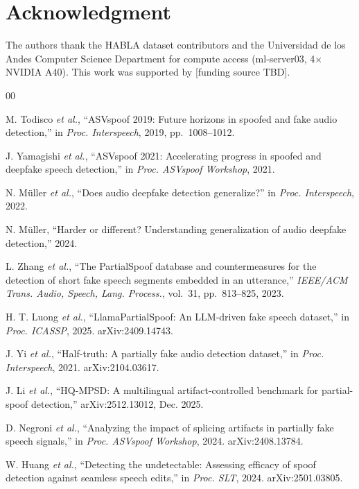 \documentclass[conference]{IEEEtran}
\begin{document}
\section*{Acknowledgment}

The authors thank the HABLA dataset contributors and the Universidad de los Andes Computer Science Department for compute access (ml-server03, 4$\times$NVIDIA A40). This work was supported by [funding source TBD].

\begin{thebibliography}{00}

 M. Todisco \emph{et al.}, ``ASVspoof 2019: Future horizons in spoofed and fake audio detection,'' in \emph{Proc. Interspeech}, 2019, pp.~1008--1012.

 J. Yamagishi \emph{et al.}, ``ASVspoof 2021: Accelerating progress in spoofed and deepfake speech detection,'' in \emph{Proc. ASVspoof Workshop}, 2021.

 N. M\"uller \emph{et al.}, ``Does audio deepfake detection generalize?'' in \emph{Proc. Interspeech}, 2022.

 N. M\"uller, ``Harder or different? Understanding generalization of audio deepfake detection,'' 2024.

 L. Zhang \emph{et al.}, ``The PartialSpoof database and countermeasures for the detection of short fake speech segments embedded in an utterance,'' \emph{IEEE/ACM Trans. Audio, Speech, Lang. Process.}, vol.~31, pp.~813--825, 2023.

 H. T. Luong \emph{et al.}, ``LlamaPartialSpoof: An LLM-driven fake speech dataset,'' in \emph{Proc. ICASSP}, 2025. arXiv:2409.14743.

 J. Yi \emph{et al.}, ``Half-truth: A partially fake audio detection dataset,'' in \emph{Proc. Interspeech}, 2021. arXiv:2104.03617.

 J. Li \emph{et al.}, ``HQ-MPSD: A multilingual artifact-controlled benchmark for partial-spoof detection,'' arXiv:2512.13012, Dec. 2025.

 D. Negroni \emph{et al.}, ``Analyzing the impact of splicing artifacts in partially fake speech signals,'' in \emph{Proc. ASVspoof Workshop}, 2024. arXiv:2408.13784.

 W. Huang \emph{et al.}, ``Detecting the undetectable: Assessing efficacy of spoof detection against seamless speech edits,'' in \emph{Proc. SLT}, 2024. arXiv:2501.03805.


\end{thebibliography}
\end{document}

